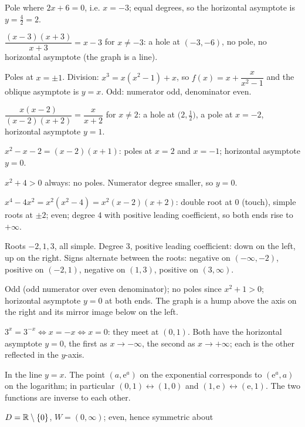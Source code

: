 \begin{solutions}
  \item Pole where $2x+6=0$, i.e. $x=-3$; equal degrees, so the horizontal
        asymptote is $y=\tfrac42=2$.
  \item $\dfrac{(x-3)(x+3)}{x+3}=x-3$ for $x\neq-3$: a hole at
        $(-3,-6)$, no pole, no horizontal asymptote (the graph is a line).
  \item Poles at $x=\pm1$. Division: $x^{3}=x(x^{2}-1)+x$, so
        $f(x)=x+\dfrac{x}{x^{2}-1}$ and the oblique asymptote is $y=x$.
        Odd: numerator odd, denominator even.
  \item $\dfrac{x(x-2)}{(x-2)(x+2)}=\dfrac{x}{x+2}$ for $x\neq2$: a hole at
        $\bigl(2,\tfrac12\bigr)$, a pole at $x=-2$, horizontal asymptote
        $y=1$.
  \item $x^{2}-x-2=(x-2)(x+1)$: poles at $x=2$ and $x=-1$; horizontal
        asymptote $y=0$.
  \item $x^{2}+4>0$ always: no poles. Numerator degree smaller, so $y=0$.
  \item $x^{4}-4x^{2}=x^{2}(x^{2}-4)=x^{2}(x-2)(x+2)$: double root at $0$
        (touch), simple roots at $\pm2$; even; degree $4$ with positive
        leading coefficient, so both ends rise to $+\infty$.
  \item Roots $-2,1,3$, all simple. Degree $3$, positive leading
        coefficient: down on the left, up on the right. Signs alternate
        between the roots: negative on $(-\infty,-2)$, positive on
        $(-2,1)$, negative on $(1,3)$, positive on $(3,\infty)$.
  \item Odd (odd numerator over even denominator); no poles since
        $x^{2}+1>0$; horizontal asymptote $y=0$ at both ends. The graph is
        a hump above the axis on the right and its mirror image below on
        the left.
  \item $3^{x}=3^{-x}\iff x=-x\iff x=0$: they meet at $(0,1)$. Both have
        the horizontal asymptote $y=0$, the first as $x\to-\infty$, the
        second as $x\to+\infty$; each is the other reflected in the
        $y$-axis.
  \item In the line $y=x$. The point $(a,\mathrm{e}^{a})$ on the
        exponential corresponds to $(\mathrm{e}^{a},a)$ on the logarithm;
        in particular $(0,1)\leftrightarrow(1,0)$ and
        $(1,\mathrm{e})\leftrightarrow(\mathrm{e},1)$. The two functions
        are inverse to each other.
  \item $D=\mathbb{R}\setminus\{0\}$, $W=(0,\infty)$; even, hence symmetric about

\end{solutions}

